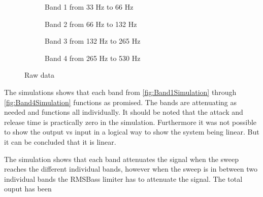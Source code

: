 \begin{figure}[H]
\centering
\begin{subfigure}[t]{0.49\textwidth}
    \centering
    
    \caption{Band 1 from 33 Hz to 66 Hz}
    \label{fig:Band1Simulation}
\end{subfigure}
\begin{subfigure}[t]{0.49\textwidth}
    \centering
    
    \caption{Band 2 from 66 Hz to 132 Hz}
    \label{fig:Band2Simulation}
\end{subfigure}
\begin{subfigure}[t]{0.49\textwidth}
    \centering
    
    \caption{Band 3 from 132 Hz to 265 Hz}
    \label{fig:Band3Simulation}
\end{subfigure}
\begin{subfigure}[t]{0.49\textwidth}
    \centering
    
    \caption{Band 4 from 265 Hz to 530 Hz}
    \label{fig:Band4Simulation}
\end{subfigure}
\caption{Raw data}
\label{fig:SimulationComparisson}
\end{figure} 

The simulations shows that each band from \autoref{fig:Band1Simulation} through \autoref{fig:Band4Simulation} functions as promised. The bands are attenuating as needed and functions all individually. It should be noted that the attack and release time is practically zero in the simulation. Furthermore it was not possible to show the output vs input in a logical way to show the system being linear. But it can be concluded that it is linear.

The simulation shows that each band attenuates the signal when the sweep reaches the different individual bands, however when the sweep is in between two individual bands the RMSBass limiter has to attenuate the signal. The total ouput has been  

 




